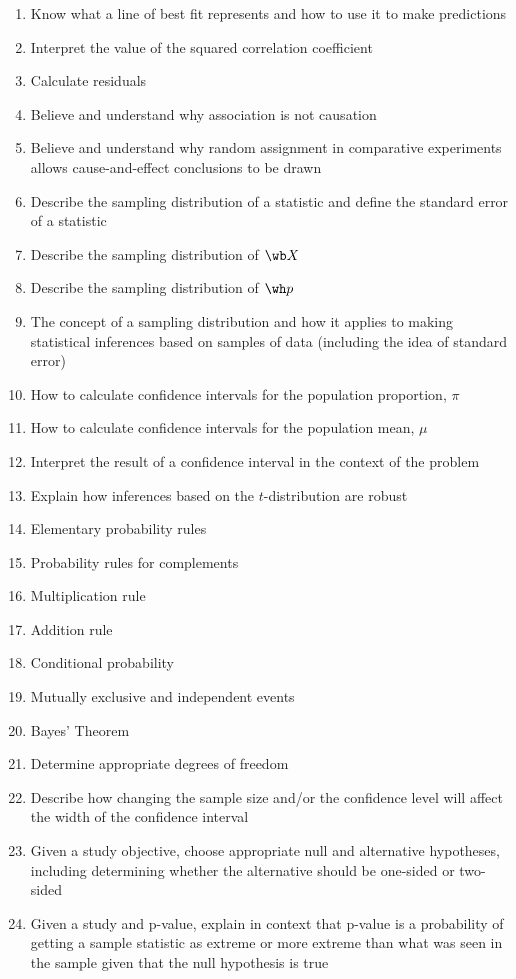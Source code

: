 \documentclass{article}
\begin{document}
\begin{enumerate}
\item Know what a line of best fit represents and how to use it to make predictions
\item Interpret the value of the squared correlation coefficient
\item Calculate residuals
\item Believe and understand why association is not causation
\item Believe and understand why random assignment in comparative experiments allows cause-and-effect conclusions to be drawn
\item Describe the sampling distribution of a statistic and define the standard error of a statistic
\item Describe the sampling distribution of $\wb X$
\item Describe the sampling distribution of $\wh p$
\item The concept of a sampling distribution and how it applies to making statistical inferences based on samples of data (including the idea of standard error)
\item How to calculate confidence intervals for the population proportion, $\pi$
\item How to calculate confidence intervals for the population mean, $\mu$
\item Interpret the result of a confidence interval in the context of the problem
\item Explain how inferences based on the $t$-distribution are robust
\item Elementary probability rules
\item Probability rules for complements
\item Multiplication rule
\item Addition rule
\item Conditional probability
\item Mutually exclusive and independent events
\item Bayes' Theorem
\item Determine appropriate degrees of freedom
\item Describe how changing the sample size and/or the confidence level will affect the width of the confidence interval
\item Given a study objective, choose appropriate null and alternative hypotheses, including determining whether the alternative should be one-sided or two-sided
\item Given a study and p-value, explain in context that p-value is a probability of getting a sample statistic as extreme or more extreme than what was seen in the sample given that the null hypothesis is true

\end{enumerate}
\end{document}
